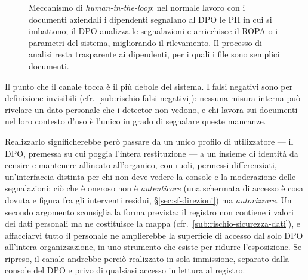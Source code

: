 \begin{figure}[htbp]
	\caption{Meccanismo di \emph{human-in-the-loop}: nel normale lavoro con i documenti aziendali i dipendenti segnalano al DPO le PII in cui si imbattono; il DPO analizza le segnalazioni e arricchisce il ROPA o i parametri del sistema, migliorando il rilevamento. Il processo di analisi resta trasparente ai dipendenti, per i quali i file sono semplici documenti.}
	\label{fig:human-in-the-loop}
\end{figure}

Il punto che il canale tocca è il più debole del sistema. I falsi negativi sono per definizione invisibili (cfr.~\ref{sub:rischio-falsi-negativi}): nessuna misura interna può rivelare un dato personale che i detector non vedono, e chi lavora sui documenti nel loro contesto d'uso è l'unico in grado di segnalare queste mancanze.

Realizzarlo significherebbe però passare da un unico profilo di utilizzatore --- il DPO, premessa su cui poggia l'intera restituzione --- a un insieme di identità da censire e mantenere allineato all'organico, con ruoli, permessi differenziati, un'interfaccia distinta per chi non deve vedere la console e la moderazione delle segnalazioni: ciò che è oneroso non è \emph{autenticare} (una schermata di accesso è cosa dovuta e figura fra gli interventi residui, §\ref{sec:sf-direzioni}) ma \emph{autorizzare}. Un secondo argomento sconsiglia la forma prevista: il registro non contiene i valori dei dati personali ma ne costituisce la mappa (cfr.~\ref{sub:rischio-sicurezza-dati}), e affacciarvi tutto il personale ne amplierebbe la superficie di accesso dal solo DPO all'intera organizzazione, in uno strumento che esiste per ridurre l'esposizione. Se ripreso, il canale andrebbe perciò realizzato in sola immissione, separato dalla console del DPO e privo di qualsiasi accesso in lettura al registro.

